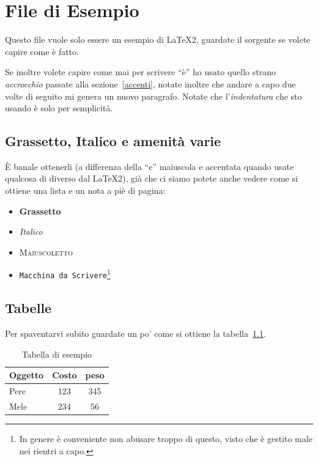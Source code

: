 \chapter{File di Esempio}
   Questo 
   file vuole solo essere un esempio di
   \LaTeX2, guardate il sorgente se volete capire come \`e fatto.

   Se inoltre volete capire come mai per scrivere ``è'' ho usato quello strano
   \emph{accrocchio} passate alla sezione~\ref{accenti}, notate inoltre
   che andare a capo due volte di seguito mi genera un nuovo paragrafo.
   Notate che l'\emph{indentatura} che sto usando \`e solo per semplicit\`a.

\section{Grassetto, Italico e amenit\`a varie}
   \`E banale ottenerli (a differenza della ``e'' maiuscola e
   accentata quando usate qualcosa di diverso dal \LaTeX2),
   gi\`a che ci siamo potete anche vedere come si
   ottiene una lista e un nota a pi\`e di pagina:
   \begin{itemize}
   \item \textbf{Grassetto}
   \item \emph{Italico}
   \item \textsc{Maiuscoletto}
   \item \texttt{Macchina da Scrivere}\footnote{In genere \`e conveniente non
                 abusare troppo di questo, visto che \`e gestito male nei rientri a capo.}
   \end{itemize}
\section{Tabelle}

   Per spaventarvi subito guardate un po' come si ottiene la tabella~\ref{miatabella}.
   \begin{table}[h!]
    \centering
    \begin{tabular}{|l|c|c|}
    \hline
    Oggetto & Costo & peso \\
    \hline
    \hline
    Pere    & 123   & 345  \\
    \hline
    Mele    & 234   & 56   \\
    \hline
    \end{tabular}
    \caption{Tabella di esempio\label{miatabella}}
   \end{table}

